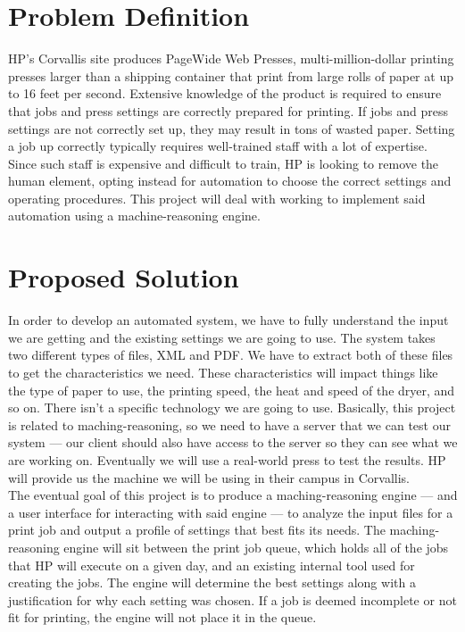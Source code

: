 \documentclass[draftclsnofoot,onecolumn,10pt]{IEEEtran}
\begin{document}
\section{Problem Definition}
HP's Corvallis site produces PageWide Web Presses, multi-million-dollar printing presses larger than a shipping container that print from large rolls of paper at up to 16 feet per second. Extensive knowledge of the product is required to ensure that jobs and press settings are correctly prepared for printing. If jobs and press settings are not correctly set up, they may result in tons of wasted paper. Setting a job up correctly typically requires well-trained staff with a lot of expertise. Since such staff is expensive and difficult to train, HP is looking to remove the human element, opting instead for automation to choose the correct settings and operating procedures. This project will deal with working to implement said automation using a machine-reasoning engine.

\bigskip
\section{Proposed Solution}
In order to develop an automated system, we have to fully understand the input we are getting and the existing settings we are going to use. The system takes two different types of files, XML and PDF. We have to extract both of these files to get the characteristics we need. These characteristics will impact things like the type of paper to use, the printing speed, the heat and speed of the dryer, and so on. There isn’t a specific technology we are going to use. Basically, this project is related to maching-reasoning, so we need to have a server that we can test our system — our client should also have access to the server so they can see what we are working on. Eventually we will use a real-world press to test the results. HP will provide us the machine we will be using in their campus in Corvallis.\\

The eventual goal of this project is to produce a maching-reasoning engine — and a user interface for interacting with said engine — to analyze the input files for a print job and output a profile of settings that best fits its needs. The maching-reasoning engine will sit between the print job queue, which holds all of the jobs that HP will execute on a given day, and an existing internal tool used for creating the jobs. The engine will determine the best settings along with a justification for why each setting was chosen. If a job is deemed incomplete or not fit for printing, the engine will not place it in the queue.\\
\end{document}
